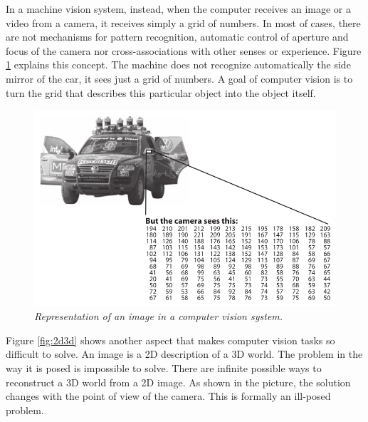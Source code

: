 	In a machine vision system, instead, when the computer receives an image or a video from a camera, it receives simply a grid of numbers. In most of cases, there are not mechanisms for pattern recognition, automatic control of aperture and focus of the camera nor cross-associations with other senses or experience.  
	Figure \ref{fig:imgMatrix} explains this concept. The machine does not recognize automatically the side mirror of the car, it sees just a grid of numbers. A goal of computer vision is to turn the grid that describes this particular object into the object itself. 
	
	
	\begin{figure}[h]
	  \begin{center} 
	    \includegraphics[scale=0.6]{images/ch_01/img_matrix.png}
	  \end{center} 
	  \caption{\textit{Representation of an image in a computer vision system.}}  
	  \label{fig:imgMatrix}
	\end{figure}

	Figure \ref{fig:2d3d} shows another aspect that makes computer vision tasks so difficult to solve. An image is a 2D description of a 3D world. The problem in the way it is posed is impossible to solve. There are infinite possible ways to reconstruct a 3D world from a 2D image. As shown in the picture, the solution changes with the point of view of the camera. This is formally an ill-posed problem.

